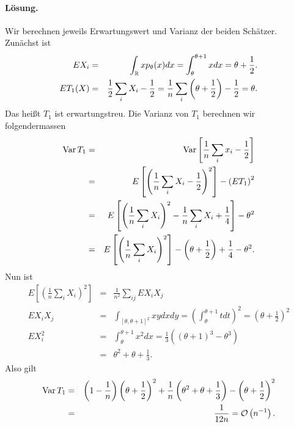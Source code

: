 \paragraph*{Lösung.} Wir berechnen jeweils Erwartungswert und Varianz der beiden Schätzer. 
Zunächst ist 
\begin{eqnarray}
	E X_i &=&  \int_{\mathbb R}^{} x p_\theta(x) dx = \int_{\theta}^{\theta+1} x dx = \theta + \frac{1}{2}. \\
	E T_1(X) &=&  \frac{1}{2} \sum_{i}^{} X_i - \frac{1}{2} = \frac{1}{n} \sum_{i}^{} \left( \theta + \frac{1}{2} \right) -\frac{1}{2} = \theta.
\end{eqnarray}
Das heißt $T_1$ ist erwartungstreu. Die Varianz von $T_1$ berechnen wir folgendermassen
\begin{eqnarray}
	\operatorname{Var} T_1 &=& \operatorname{Var} \left[ \frac{1}{n} \sum_{i}^{} x_i - \frac{1}{2} \right] \\
	&=& E\left[ \left(  \frac{1}{n} \sum_{i}^{} X_i - \frac{1}{2} \right)^2  \right] - \left( E T_1 \right)^2 \\
	&=& E \left[  \left( \frac{1}{n} \sum_{i}^{} X_i \right)^2  - \frac{1}{n}\sum_{i}^{} X_i +\frac{1}{4} \right]-\theta^2 \\
	&=& E \left[ \left( \frac{1}{n} \sum_{i}^{} X_i \right)^2 \right] - \left( \theta + \frac{1}{2} \right) + \frac{1}{4}-\theta^2.
\end{eqnarray}
Nun ist 
\begin{eqnarray}
	E \left[ \left( \frac{1}{n} \sum_{i}^{} X_i \right)^2 \right] &=& \frac{1}{n^2} \sum_{ij}^{} E X_i X_j \\
	E X_i X_j &=& \int_{[\theta,\theta+1]^2}^{} xy dx dy = \left( \int_{\theta}^{\theta+1} t dt \right)^2 = \left( \theta+\frac{1}{2} \right)^2 \\
	E X_i^2 &=& \int_{\theta}^{\theta+1} x^2 dx = \frac{1}{3}\left( \left( \theta+1 \right)^3 - \theta^3 \right )\\
	&=& \theta^2 + \theta + \frac{1}{3}.
\end{eqnarray}
Also gilt
\begin{eqnarray}
	\operatorname{Var} T_1 &=& \left( 1-\frac{1}{n} \right)\left( \theta+\frac{1}{2} \right)^2+\frac{1}{n}\left( \theta^2+\theta+\frac{1}{3} \right)     - \left( \theta+\frac{1}{2} \right)^2 \\
	&=& \frac{1}{12 n} = \mathcal O \left( n^{-1} \right).
\end{eqnarray}

